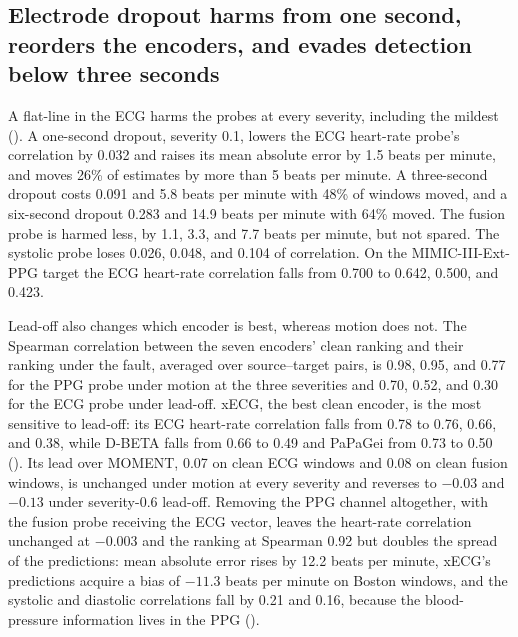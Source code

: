 \documentclass[pmlr,twocolumn,10pt]{jmlr}
\newcommand{\domainmodel}{xECG}
\newcommand{\tsmodel}{MOMENT}
\begin{document}
\subsection{Electrode dropout harms from one second, reorders the encoders, and evades detection below three seconds}
\label{sec:leadoff}

A flat-line in the ECG harms the probes at every severity, including the mildest (). A one-second dropout, severity 0.1, lowers the ECG heart-rate probe's correlation by 0.032 and raises its mean absolute error by 1.5 beats per minute, and moves 26\% of estimates by more than 5 beats per minute. A three-second dropout costs 0.091 and 5.8 beats per minute with 48\% of windows moved, and a six-second dropout 0.283 and 14.9 beats per minute with 64\% moved. The fusion probe is harmed less, by 1.1, 3.3, and 7.7 beats per minute, but not spared. The systolic probe loses 0.026, 0.048, and 0.104 of correlation. On the MIMIC-III-Ext-PPG target the ECG heart-rate correlation falls from 0.700 to 0.642, 0.500, and 0.423.

Lead-off also changes which encoder is best, whereas motion does not. The Spearman correlation between the seven encoders' clean ranking and their ranking under the fault, averaged over source--target pairs, is 0.98, 0.95, and 0.77 for the PPG probe under motion at the three severities and 0.70, 0.52, and 0.30 for the ECG probe under lead-off. \domainmodel{}, the best clean encoder, is the most sensitive to lead-off: its ECG heart-rate correlation falls from 0.78 to 0.76, 0.66, and 0.38, while D-BETA falls from 0.66 to 0.49 and PaPaGei from 0.73 to 0.50 (). Its lead over \tsmodel{}, 0.07 on clean ECG windows and 0.08 on clean fusion windows, is unchanged under motion at every severity and reverses to $-0.03$ and $-0.13$ under severity-0.6 lead-off. Removing the PPG channel altogether, with the fusion probe receiving the ECG vector, leaves the heart-rate correlation unchanged at $-0.003$ and the ranking at Spearman 0.92 but doubles the spread of the predictions: mean absolute error rises by 12.2 beats per minute, \domainmodel{}'s predictions acquire a bias of $-11.3$ beats per minute on Boston windows, and the systolic and diastolic correlations fall by 0.21 and 0.16, because the blood-pressure information lives in the PPG ().
\end{document}
